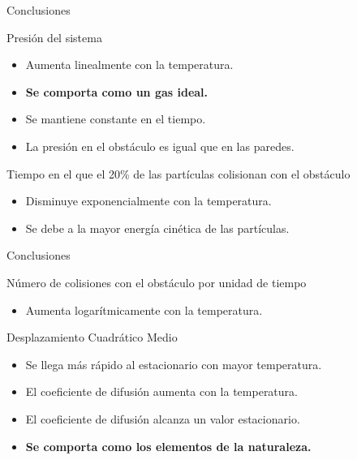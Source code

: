 \documentclass{beamer}
\begin{document}
        \begin{frame}{Conclusiones}
            \begin{block}{Presión del sistema}
                \begin{itemize}
                    \item Aumenta linealmente con la temperatura.
                    \item \textbf{Se comporta como un gas ideal.}
                    \item Se mantiene constante en el tiempo.
                    \item La presión en el obstáculo es igual que en las paredes.
                \end{itemize}
            \end{block}
            \begin{block}{Tiempo en el que el 20\% de las partículas colisionan con el obstáculo}
                \begin{itemize}
                    \item Disminuye exponencialmente con la temperatura.
                    \item Se debe a la mayor energía cinética de las partículas.
                \end{itemize}
            \end{block}
        \end{frame}

        \begin{frame}{Conclusiones}
            \begin{block}{Número de colisiones con el obstáculo por unidad de tiempo}
                \begin{itemize}
                    \item Aumenta logarítmicamente con la temperatura.
                \end{itemize}
            \end{block}
            \begin{block}{Desplazamiento Cuadrático Medio}
                \begin{itemize}
                    \item Se llega más rápido al estacionario con mayor temperatura.
                    \item El coeficiente de difusión aumenta con la temperatura.
                    \item El coeficiente de difusión alcanza un valor estacionario.
                    \item \textbf{Se comporta como los elementos de la naturaleza.}
                \end{itemize}
            \end{block}
        \end{frame}
\end{document}
